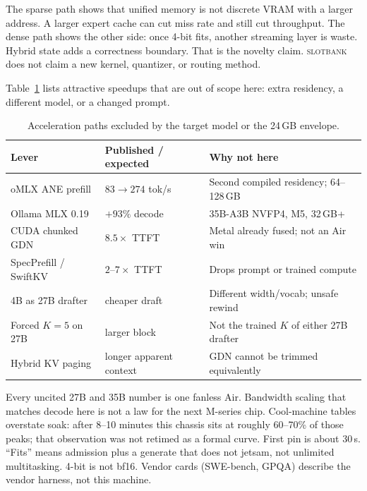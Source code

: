 \documentclass[11pt]{article}
\theoremstyle{definition}
\newcommand{\slotbank}{\textsc{slotbank}}
\begin{document}
The sparse path shows that unified memory is not discrete VRAM with a larger address. A larger expert cache can cut miss rate and still cut throughput. The dense path shows the other side: once 4-bit fits, another streaming layer is waste. Hybrid state adds a correctness boundary. That is the novelty claim. \slotbank{} does not claim a new kernel, quantizer, or routing method.

Table~\ref{tab:reject} lists attractive speedups that are out of scope here: extra residency, a different model, or a changed prompt.

\begin{table}[t]
\centering
\caption{Acceleration paths excluded by the target model or the 24\,GB envelope.}
\label{tab:reject}
\scriptsize
\begin{tabular}{@{}p{3.4cm}p{4.2cm}p{5.6cm}@{}}
\toprule
Lever & Published / expected & Why not here \\
\midrule
oMLX ANE prefill & $83{\to}274$ tok/s~\citep{weschera2026} & Second compiled residency; 64--128\,GB \\
Ollama MLX 0.19 & ${+}93\%$ decode~\citep{ollama019} & 35B-A3B NVFP4, M5, 32\,GB+ \\
CUDA chunked GDN & $8.5{\times}$ TTFT~\citep{mlxvlm1423} & Metal already fused; not an Air win \\
SpecPrefill / SwiftKV & $2$--$7{\times}$ TTFT~\citep{yuan2024specprefill,swiftkv} & Drops prompt or trained compute \\
4B as 27B drafter & cheaper draft & Different width/vocab; unsafe rewind \\
Forced $K{=}5$ on 27B & larger block & Not the trained $K$ of either 27B drafter \\
Hybrid KV paging & longer apparent context & GDN cannot be trimmed equivalently \\
\bottomrule
\end{tabular}
\end{table}

Every uncited 27B and 35B number is one fanless Air. Bandwidth scaling that matches decode here is not a law for the next M-series chip. Cool-machine tables overstate soak: after 8--10 minutes this chassis sits at roughly 60--70\% of those peaks; that observation was not retimed as a formal curve. First pin is about 30\,s. ``Fits'' means admission plus a generate that does not jetsam, not unlimited multitasking. 4-bit is not bf16. Vendor cards (SWE-bench, GPQA) describe the vendor harness, not this machine.
\end{document}
